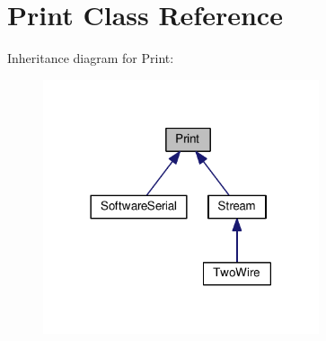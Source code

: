 \hypertarget{class_print}{}\section{Print Class Reference}
\label{class_print}


Inheritance diagram for Print\+:
\nopagebreak
\begin{figure}[H]
\begin{center}
\leavevmode
\includegraphics[width=230pt]{class_print__inherit__graph}
\end{center}
\end{figure}
